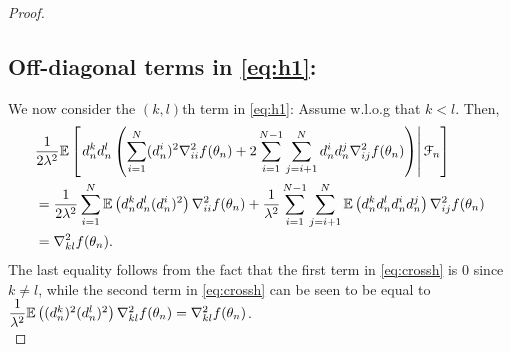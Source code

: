 \begin{proof}
\subsection*{Off-diagonal terms in \eqref{eq:h1}:}

We now consider the $(k,l)$th term in \eqref{eq:h1}: Assume w.l.o.g that $k<l$. Then,
\begin{align}
 &\dfrac{1}{2 \lambda^2} \mathbb{E}\left[\left.d_n^k d_n^l \left(\sum\limits_{i=1}^N (d_n^i)^2 \nabla^2_{ii} f(\theta_n)  
+ 2\sum\limits_{i=1}^{N-1}\sum\limits_{j=i+1}^N d_n^i d_n^j \nabla^2_{ij} f(\theta_n)\right)\right| \mathcal{F}_n \right] \nonumber\\
&=\dfrac{1}{2 \lambda^2} \sum\limits_{i=1}^N \mathbb{E} \left(d_n^k d_n^l (d_n^i)^2 \right)\nabla^2_{ii} f(\theta_n) + \dfrac{1}{\lambda^2}\sum\limits_{i=1}^{N-1}\sum\limits_{j=i+1}^N \mathbb{E}\left(d_n^k d_n^l d_n^i d_n^j\right) \nabla^2_{ij} f(\theta_n) \label{eq:crossh}\\
&=  \nabla^2_{kl} f(\theta_n).\nonumber
\end{align}
The last equality follows from the fact that the first term in \eqref{eq:crossh} is $0$ since $k\ne l$, while the second term in \eqref{eq:crossh} can be seen to be equal to $\dfrac{1}{\lambda^2} \mathbb{E}\left((d_n^k)^2 (d_n^l)^2\right) \nabla^2_{kl} f(\theta_n) = \nabla^2_{kl} f(\theta_n)$. \\
\end{proof}


